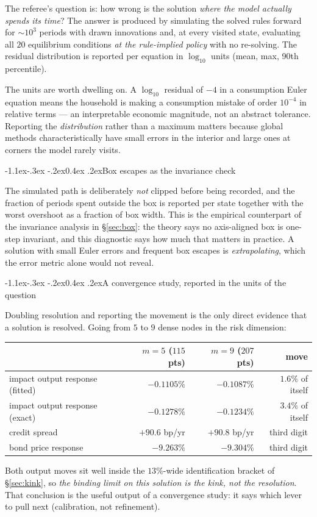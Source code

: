 \documentclass[10pt,a4paper]{article}
\makeatletter
\theoremstyle{definition}
\theoremstyle{plain}
\theoremstyle{remark}
\renewcommand\subsection{\@startsection{subsection}{2}{\z@}%
  {-1.1ex\@plus -.3ex \@minus -.2ex}{0.4ex \@plus .2ex}{\normalfont\normalsize\bfseries}}
\makeatother
\begin{document}
The referee's question is: how wrong is the solution \emph{where the model actually spends its
time}? The answer is produced by simulating the solved rules forward for $\sim10^3$ periods
with drawn innovations and, at every visited state, evaluating all $20$ equilibrium conditions
\emph{at the rule-implied policy} with no re-solving. The residual distribution is reported per
equation in $\log_{10}$ units (mean, max, 90th percentile).

The units are worth dwelling on. A $\log_{10}$ residual of $-4$ in a consumption Euler
equation means the household is making a consumption mistake of order $10^{-4}$ in relative
terms --- an interpretable economic magnitude, not an abstract tolerance. Reporting the
\emph{distribution} rather than a maximum matters because global methods characteristically
have small errors in the interior and large ones at corners the model rarely visits.

\subsection{Box escapes as the invariance check}

The simulated path is deliberately \emph{not} clipped before being recorded, and the fraction
of periods spent outside the box is reported per state together with the worst overshoot as a
fraction of box width. This is the empirical counterpart of the invariance analysis in
\S\ref{sec:box}: the theory says no axis-aligned box is one-step invariant, and this diagnostic
says how much that matters in practice. A solution with small Euler errors and frequent box
escapes is \emph{extrapolating}, which the error metric alone would not reveal.

\subsection{A convergence study, reported in the units of the question}

Doubling resolution and reporting the movement is the only direct evidence that a solution is
resolved. Going from $5$ to $9$ dense nodes in the risk dimension:
\begin{center}\small
\begin{tabular}{@{}lrrr@{}}
\toprule
& $m=5$ ($115$ pts) & $m=9$ ($207$ pts) & move \\
\midrule
impact output response (fitted) & $-0.1105\%$ & $-0.1087\%$ & $1.6\%$ of itself \\
impact output response (exact) & $-0.1278\%$ & $-0.1234\%$ & $3.4\%$ of itself \\
credit spread & $+90.6$ bp/yr & $+90.8$ bp/yr & third digit \\
bond price response & $-9.263\%$ & $-9.304\%$ & third digit \\
\bottomrule
\end{tabular}
\end{center}
Both output moves sit well inside the $13\%$-wide identification bracket of \S\ref{sec:kink},
so \emph{the binding limit on this solution is the kink, not the resolution}. That conclusion
is the useful output of a convergence study: it says which lever to pull next (calibration,
not refinement).
\end{document}
